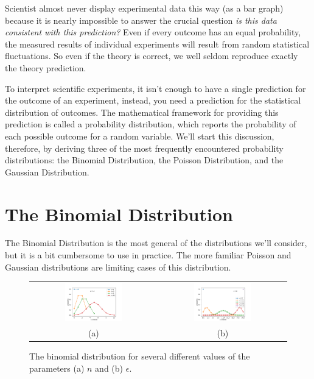 \documentclass[12pt,oneside]{book}
\begin{document}
Scientist almost never display experimental data this way (as a bar
graph) because it is nearly impossible to answer the crucial question
{\em is this data consistent with this prediction?}  Even if every
outcome has an equal probability, the measured results of individual
experiments will result from random statistical fluctuations.  So even
if the theory is correct, we well seldom reproduce exactly the theory
prediction.

To interpret scientific experiments, it isn't enough to have a single
prediction for the outcome of an experiment, instead, you need a
prediction for the statistical distribution of outcomes.  The
mathematical framework for providing this prediction is called a
probability distribution, which reports the probability of each
possible outcome for a random variable.  We'll start this discussion,
therefore, by deriving three of the most frequently encountered
probability distributions: the Binomial Distribution, the Poisson
Distribution, and the Gaussian Distribution.

\section{The  Binomial Distribution}

The Binomial Distribution is the most general of the distributions
we'll consider, but it is a bit cumbersome to use in practice.  The
more familiar Poisson and Gaussian distributions are limiting cases of
this distribution.

\begin{figure}[htbp]
\begin{center}
\begin{tabular}{cc}
{\includegraphics[width=0.47\textwidth]{figs/binom_n.pdf}} &
{\includegraphics[width=0.47\textwidth]{figs/binom_eps.pdf}} \\
(a) & (b) \\
\end{tabular}
\end{center}
\caption{\label{fig:binom} The binomial distribution for several different values of the parameters (a) $n$ and (b) $\epsilon$.}
\end{figure}
\end{document}
